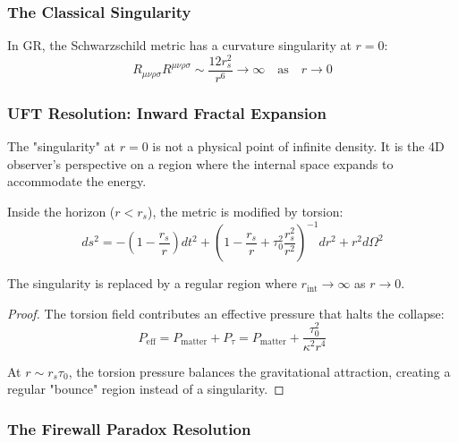 \subsubsection{The Classical Singularity}

In GR, the Schwarzschild metric has a curvature singularity at $r = 0$:
\begin{equation}
    R_{\mu\nu\rho\sigma}R^{\mu\nu\rho\sigma} \sim \frac{12r_s^2}{r^6} \to \infty \quad \text{as} \quad r \to 0
\end{equation}

\subsubsection{UFT Resolution: Inward Fractal Expansion}

\begin{insight}
The "singularity" at $r = 0$ is not a physical point of infinite density. It is the 4D observer's perspective on a region where the internal space expands to accommodate the energy.
\end{insight}

\begin{theorem}
Inside the horizon ($r < r_s$), the metric is modified by torsion:
\begin{equation}
    ds^2 = -\left(1 - \frac{r_s}{r}\right)dt^2 + \left(1 - \frac{r_s}{r} + \tau_0^2\frac{r_s^2}{r^2}\right)^{-1}dr^2 + r^2 d\Omega^2
\end{equation}

The singularity is replaced by a regular region where $r_{\text{int}} \to \infty$ as $r \to 0$.
\end{theorem}

\begin{proof}
The torsion field contributes an effective pressure that halts the collapse:
\begin{equation}
    P_{\text{eff}} = P_{\text{matter}} + P_{\tau} = P_{\text{matter}} + \frac{\tau_0^2}{\kappa^2 r^4}
\end{equation}

At $r \sim r_s \tau_0$, the torsion pressure balances the gravitational attraction, creating a regular "bounce" region instead of a singularity.
\end{proof}

\subsubsection{The Firewall Paradox Resolution}


